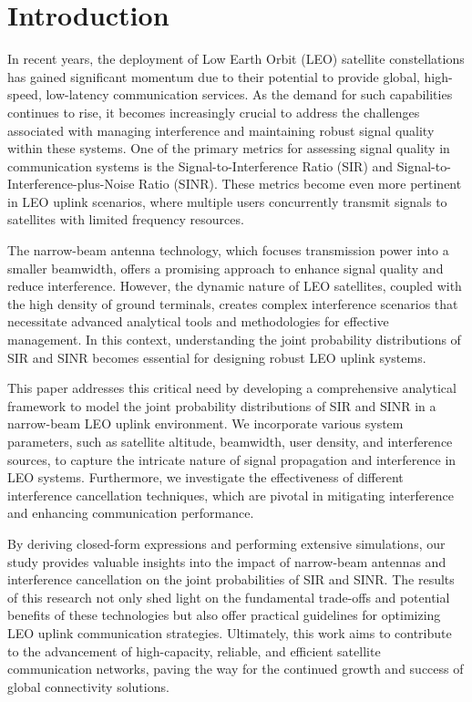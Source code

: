 \documentclass[lettersize,journal]{IEEEtran}
\begin{document}
\section{Introduction}

In recent years, the deployment of Low Earth Orbit (LEO) satellite constellations has gained significant momentum due to their potential to provide global, high-speed, low-latency communication services. As the demand for such capabilities continues to rise, it becomes increasingly crucial to address the challenges associated with managing interference and maintaining robust signal quality within these systems. One of the primary metrics for assessing signal quality in communication systems is the Signal-to-Interference Ratio (SIR) and Signal-to-Interference-plus-Noise Ratio (SINR). These metrics become even more pertinent in LEO uplink scenarios, where multiple users concurrently transmit signals to satellites with limited frequency resources.

The narrow-beam antenna technology, which focuses transmission power into a smaller beamwidth, offers a promising approach to enhance signal quality and reduce interference. However, the dynamic nature of LEO satellites, coupled with the high density of ground terminals, creates complex interference scenarios that necessitate advanced analytical tools and methodologies for effective management. In this context, understanding the joint probability distributions of SIR and SINR becomes essential for designing robust LEO uplink systems.

This paper addresses this critical need by developing a comprehensive analytical framework to model the joint probability distributions of SIR and SINR in a narrow-beam LEO uplink environment. We incorporate various system parameters, such as satellite altitude, beamwidth, user density, and interference sources, to capture the intricate nature of signal propagation and interference in LEO systems. Furthermore, we investigate the effectiveness of different interference cancellation techniques, which are pivotal in mitigating interference and enhancing communication performance.

By deriving closed-form expressions and performing extensive simulations, our study provides valuable insights into the impact of narrow-beam antennas and interference cancellation on the joint probabilities of SIR and SINR. The results of this research not only shed light on the fundamental trade-offs and potential benefits of these technologies but also offer practical guidelines for optimizing LEO uplink communication strategies. Ultimately, this work aims to contribute to the advancement of high-capacity, reliable, and efficient satellite communication networks, paving the way for the continued growth and success of global connectivity solutions.
\end{document}
